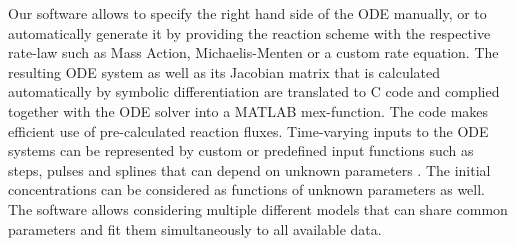 \documentclass{bioinfo}
\begin{document}
Our software allows to specify the right hand side of the ODE manually, or to 
automatically generate it by  providing the reaction scheme with the respective rate-law such as Mass Action, Michaelis-Menten or a custom rate 
equation. The resulting ODE system as well as its Jacobian matrix that is calculated 
automatically by symbolic differentiation are translated to C code and complied together 
with the ODE solver into a MATLAB mex-function. The code makes efficient use of pre-calculated reaction fluxes. 
Time-varying inputs to the ODE systems can be represented by custom or predefined input 
functions such as steps, pulses and splines that can depend on unknown parameters 
\citep{Schelker:2012uq}. The initial concentrations can be considered as functions of 
unknown parameters as well. The software allows considering multiple different models 
that can share common parameters and fit them simultaneously to all available data. 
\end{document}
